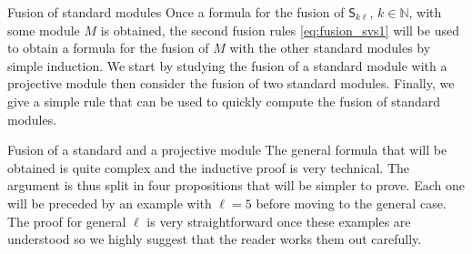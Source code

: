 \documentclass[reqno]{amsart}
\newcommand{\ds}[1]{\mathsf S_{#1}}
\newcommand{\lc}{\ell}
\begin{document}
\begin{section}{Fusion of standard modules}
 Once a formula for the fusion of $\ds{k \ell}$, $k \in \mathbb{N}$, with some module $M$ is obtained, the second fusion rules \eqref{eq:fusion_svs1} will be used to obtain a formula for the fusion of $M$ with the other standard modules by simple induction. We start by studying the fusion of a standard module with a projective module then consider the fusion of two standard modules. Finally, we give a simple rule that can be used to quickly compute the fusion of standard modules. 
\begin{subsection}{Fusion of a standard and a projective module}
The general formula that will be obtained is quite complex and the inductive proof is very technical. The argument is thus split in four propositions that will be simpler to prove. Each one will be preceded by an example with $\lc=5$ before moving to the general case. The proof for general $\lc$ is very straightforward once these examples are understood so we highly suggest that the reader works them out carefully.


\end{subsection}
\end{section}
\end{document}
